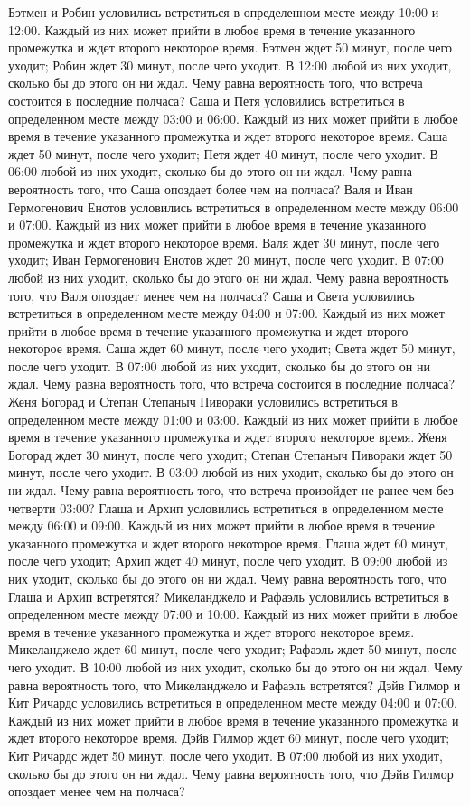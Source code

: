 Бэтмен и Робин условились встретиться в определенном месте между 10:00 и 12:00. Каждый из них может прийти в любое время в течение указанного промежутка и ждет второго некоторое время. Бэтмен ждет 50 минут, после чего уходит; Робин ждет 30 минут, после чего уходит. В 12:00 любой из них уходит, сколько бы до этого он ни ждал. Чему равна вероятность того, что встреча состоится в последние полчаса?
Саша и Петя условились встретиться в определенном месте между 03:00 и 06:00. Каждый из них может прийти в любое время в течение указанного промежутка и ждет второго некоторое время. Саша ждет 50 минут, после чего уходит; Петя ждет 40 минут, после чего уходит. В 06:00 любой из них уходит, сколько бы до этого он ни ждал. Чему равна вероятность того, что Саша опоздает более чем на полчаса?
Валя и Иван Гермогенович Енотов условились встретиться в определенном месте между 06:00 и 07:00. Каждый из них может прийти в любое время в течение указанного промежутка и ждет второго некоторое время. Валя ждет 30 минут, после чего уходит; Иван Гермогенович Енотов ждет 20 минут, после чего уходит. В 07:00 любой из них уходит, сколько бы до этого он ни ждал. Чему равна вероятность того, что Валя опоздает менее чем на полчаса?
Саша и Света условились встретиться в определенном месте между 04:00 и 07:00. Каждый из них может прийти в любое время в течение указанного промежутка и ждет второго некоторое время. Саша ждет 60 минут, после чего уходит; Света ждет 50 минут, после чего уходит. В 07:00 любой из них уходит, сколько бы до этого он ни ждал. Чему равна вероятность того, что встреча состоится в последние полчаса?
Женя Богорад и Степан Степаныч Пивораки условились встретиться в определенном месте между 01:00 и 03:00. Каждый из них может прийти в любое время в течение указанного промежутка и ждет второго некоторое время. Женя Богорад ждет 30 минут, после чего уходит; Степан Степаныч Пивораки ждет 50 минут, после чего уходит. В 03:00 любой из них уходит, сколько бы до этого он ни ждал. Чему равна вероятность того, что встреча произойдет не ранее чем без четверти 03:00?
Глаша и Архип условились встретиться в определенном месте между 06:00 и 09:00. Каждый из них может прийти в любое время в течение указанного промежутка и ждет второго некоторое время. Глаша ждет 60 минут, после чего уходит; Архип ждет 40 минут, после чего уходит. В 09:00 любой из них уходит, сколько бы до этого он ни ждал. Чему равна вероятность того, что Глаша и Архип встретятся?
Микеланджело и Рафаэль условились встретиться в определенном месте между 07:00 и 10:00. Каждый из них может прийти в любое время в течение указанного промежутка и ждет второго некоторое время. Микеланджело ждет 60 минут, после чего уходит; Рафаэль ждет 50 минут, после чего уходит. В 10:00 любой из них уходит, сколько бы до этого он ни ждал. Чему равна вероятность того, что Микеланджело и Рафаэль встретятся?
Дэйв Гилмор и Кит Ричардс условились встретиться в определенном месте между 04:00 и 07:00. Каждый из них может прийти в любое время в течение указанного промежутка и ждет второго некоторое время. Дэйв Гилмор ждет 60 минут, после чего уходит; Кит Ричардс ждет 50 минут, после чего уходит. В 07:00 любой из них уходит, сколько бы до этого он ни ждал. Чему равна вероятность того, что Дэйв Гилмор опоздает менее чем на полчаса?